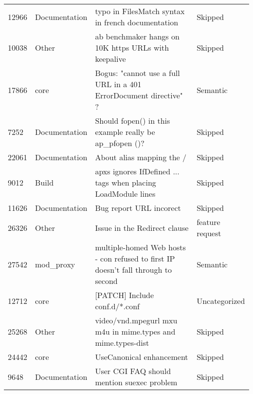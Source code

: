 \begin{longtable}[c]{llll}
12966  & Documentation      & typo in FilesMatch syntax in french documentation                                                              & Skipped           \\
10038  & Other              & ab benchmaker hangs on 10K https URLs with keepalive                                                           & Skipped           \\
17866  & core               & Bogus: "cannot use a full URL in a 401 ErrorDocument directive" ?                                              & Semantic          \\
7252   & Documentation      & Should fopen() in this example really be ap\_pfopen ()?                                                        & Skipped           \\
22061  & Documentation      & About alias mapping the /                                                                                      & Skipped           \\
9012   & Build              & apxs ignores IfDefined ... tags when placing LoadModule lines                             & Skipped           \\
11626  & Documentation      & Bug report URL incorect                                                                                        & Skipped           \\
26326  & Other              & Issue in the Redirect clause                                                                                   & feature request   \\
27542  & mod\_proxy         & multiple-homed Web hosts - con refused to first IP doesn't fall through to second                              & Semantic          \\
12712  & core               & {[}PATCH{]} Include conf.d/*.conf                                                                              & Uncategorized     \\
25268  & Other              & video/vnd.mpegurl mxu m4u in mime.types and mime.types-dist                                                    & Skipped           \\
24442  & core               & UseCanonical enhancement                                                                                       & Skipped           \\
9648   & Documentation      & User CGI FAQ should mention suexec problem                                                                     & Skipped           \\

\end{longtable}

